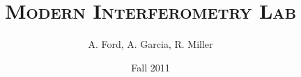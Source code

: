 \documentclass[twocolumn]{article}
\begin{document}
  
\graphicspath{{./images/}}

\title{\textsc{Modern Interferometry Lab}}
\author{A. Ford, A. Garcia, R. Miller}
\date{Fall 2011}
\maketitle

\onecolumn
\tableofcontents

\twocolumn



\onecolumn
		
\twocolumn




	
\clearpage	
	
\appendix
\twocolumn


\clearpage




\end{document}
